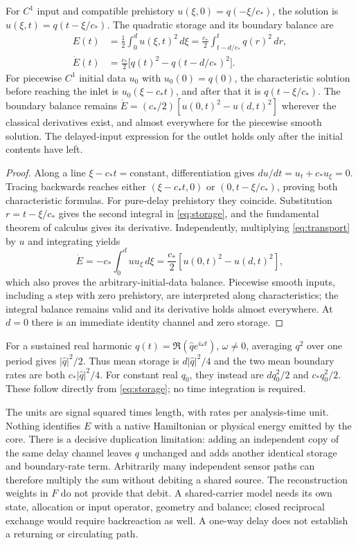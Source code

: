 \begin{theorem}\label{thm:storage}
For $C^1$ input and compatible prehistory $u(\xi,0)=q(-\xi/c_*)$, the solution is $u(\xi,t)=q(t-\xi/c_*)$. The quadratic storage and its boundary balance are
\begin{equation}\label{eq:storage}
\begin{aligned}
E(t)&=\frac12\int_0^d u(\xi,t)^2\,d\xi
=\frac{c_*}{2}\int_{t-d/c_*}^{t}q(r)^2\,dr,\\
\dot E(t)&=\frac{c_*}{2}\big[q(t)^2-q(t-d/c_*)^2\big].
\end{aligned}
\end{equation}
For piecewise $C^1$ initial data $u_0$ with $u_0(0)=q(0)$, the characteristic solution before reaching the inlet is $u_0(\xi-c_*t)$, and after that it is $q(t-\xi/c_*)$. The boundary balance remains $\dot E=(c_*/2)[u(0,t)^2-u(d,t)^2]$ wherever the classical derivatives exist, and almost everywhere for the piecewise smooth solution. The delayed-input expression for the outlet holds only after the initial contents have left.
\end{theorem}
\begin{proof}
Along a line $\xi-c_*t=\text{constant}$, differentiation gives $d u/dt=u_t+c_*u_\xi=0$. Tracing backwards reaches either $(\xi-c_*t,0)$ or $(0,t-\xi/c_*)$, proving both characteristic formulas. For pure-delay prehistory they coincide. Substitution $r=t-\xi/c_*$ gives the second integral in \eqref{eq:storage}, and the fundamental theorem of calculus gives its derivative. Independently, multiplying \eqref{eq:transport} by $u$ and integrating yields
\[
\dot E=-c_*\int_0^d u u_\xi\,d\xi
=\frac{c_*}{2}[u(0,t)^2-u(d,t)^2],
\]
which also proves the arbitrary-initial-data balance. Piecewise smooth inputs, including a step with zero prehistory, are interpreted along characteristics; the integral balance remains valid and its derivative holds almost everywhere. At $d=0$ there is an immediate identity channel and zero storage.
\end{proof}

For a sustained real harmonic $q(t)=\Re(\widehat q e^{i\omega t})$, $\omega\ne0$, averaging $q^2$ over one period gives $|\widehat q|^2/2$. Thus mean storage is $d|\widehat q|^2/4$ and the two mean boundary rates are both $c_*|\widehat q|^2/4$. For constant real $q_0$, they instead are $dq_0^2/2$ and $c_*q_0^2/2$. These follow directly from \eqref{eq:storage}; no time integration is required.

The units are signal squared times length, with rates per analysis-time unit. Nothing identifies $E$ with a native Hamiltonian or physical energy emitted by the core. There is a decisive duplication limitation: adding an independent copy of the same delay channel leaves $q$ unchanged and adds another identical storage and boundary-rate term. Arbitrarily many independent sensor paths can therefore multiply the sum without debiting a shared source. The reconstruction weights in $F$ do not provide that debit. A shared-carrier model needs its own state, allocation or input operator, geometry and balance; closed reciprocal exchange would require backreaction as well. A one-way delay does not establish a returning or circulating path.
